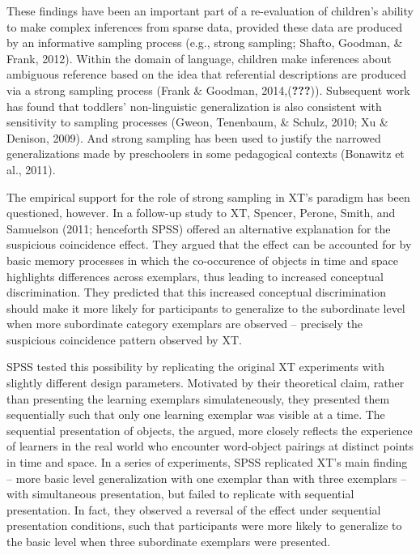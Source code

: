 \documentclass[english,floatsintext,man]{apa6}
\theoremstyle{definition}
\theoremstyle{definition}
\theoremstyle{remark}
\begin{document}
These findings have been an important part of a re-evaluation of
children's ability to make complex inferences from sparse data, provided
these data are produced by an informative sampling process (e.g., strong
sampling; Shafto, Goodman, \& Frank, 2012). Within the domain of
language, children make inferences about ambiguous reference based on
the idea that referential descriptions are produced via a strong
sampling process (Frank \& Goodman, 2014,({\textbf{???}})). Subsequent
work has found that toddlers' non-linguistic generalization is also
consistent with sensitivity to sampling processes (Gweon, Tenenbaum, \&
Schulz, 2010; Xu \& Denison, 2009). And strong sampling has been used to
justify the narrowed generalizations made by preschoolers in some
pedagogical contexts (Bonawitz et al., 2011).

The empirical support for the role of strong sampling in XT's paradigm
has been questioned, however. In a follow-up study to XT, Spencer,
Perone, Smith, and Samuelson (2011; henceforth SPSS) offered an
alternative explanation for the suspicious coincidence effect. They
argued that the effect can be accounted for by basic memory processes in
which the co-occurence of objects in time and space highlights
differences across exemplars, thus leading to increased conceptual
discrimination. They predicted that this increased conceptual
discrimination should make it more likely for participants to generalize
to the subordinate level when more subordinate category exemplars are
observed -- precisely the suspicious coincidence pattern observed by XT.

SPSS tested this possibility by replicating the original XT experiments
with slightly different design parameters. Motivated by their
theoretical claim, rather than presenting the learning exemplars
simulateneously, they presented them sequentially such that only one
learning exemplar was visible at a time. The sequential presentation of
objects, the argued, more closely reflects the experience of learners in
the real world who encounter word-object pairings at distinct points in
time and space. In a series of experiments, SPSS replicated XT's main
finding -- more basic level generalization with one exemplar than with
three exemplars -- with simultaneous presentation, but failed to
replicate with sequential presentation. In fact, they observed a
reversal of the effect under sequential presentation conditions, such
that participants were more likely to generalize to the basic level when
three subordinate exemplars were presented.
\end{document}
